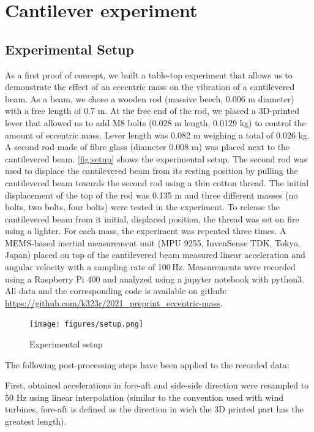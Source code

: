 \documentclass{article}
\begin{document}
\clearpage

\section{Cantilever experiment}
\label{sec:experiment}

\subsection{Experimental Setup}

As a first proof of concept, we built a table-top experiment that allows us to demonstrate the effect of an eccentric mass on the vibration of a cantilevered beam. As a beam, we chose a wooden rod (massive beech, 0.006 m diameter) with a free length of 0.7 m. At the free end of the rod, we placed a 3D-printed lever that allowed us to add M8 bolts (0.028 m length, 0.0129 kg) to control the amount of eccentric mass. Lever length was 0.082 m weighing a total of 0.026 kg. A second rod made of fibre glass (diameter 0.008 m) was placed next to the cantilevered beam. \autoref{fig:setup} shows the experimental setup. The second rod was used to displace the cantilevered beam from its resting position  by pulling the cantilevered beam towards the second rod using a thin cotton thread. The initial displacement of the top of the rod was 0.135 m and three different masses (no bolts, two bolts, four bolts) were tested in the experiment. To release the cantilevered beam from it initial, displaced position, the thread was set on fire using a lighter. For each mass, the experiment was repeated three times. A MEMS-based inertial measurement unit (MPU 9255, InvenSense TDK, Tokyo, Japan) placed on top of the cantilevered beam measured linear acceleration and angular velocity with a sampling rate of 100\,Hz. Measurements were recorded using a Raspberry Pi 400 and analyzed using a jupyter notebook with python3. All data and the corresponding code is available on github: \url{https://github.com/k323r/2021_preprint_eccentric-mass}.

\begin{figure}[ht!]
    \centering
    \texttt{[image: figures/setup.png]}
    \caption{Experimental setup}
    \label{fig:setup}
\end{figure}

The following post-processing steps have been applied to the recorded data:

First, obtained accelerations in fore-aft and side-side direction were resampled to 50 Hz using linear interpolation (similar to the convention used with wind turbines, fore-aft is defined as the direction in wich the 3D printed part has the greatest length). 
\end{document}
